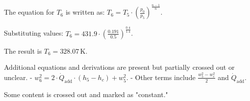 The equation for \( T_6 \) is written as:  
\( T_6 = T_5 \cdot \left( \frac{p_0}{p_5} \right)^{\frac{n-1}{n}} \).  

Substituting values:  
\( T_6 = 431.9 \cdot \left( \frac{0.191}{0.5} \right)^{\frac{0.4}{1.4}} \).  

The result is \( T_6 = 328.07 \, \text{K} \).  

Additional equations and derivations are present but partially crossed out or unclear.  
- \( w_6^2 = 2 \cdot \dot{Q}_{\text{add}} \cdot \left( h_5 - h_c \right) + w_5^2 \).  
- Other terms include \( \frac{w_5^2 - w_c^2}{2} \) and \( \dot{Q}_{\text{add}} \).  

Some content is crossed out and marked as "constant."